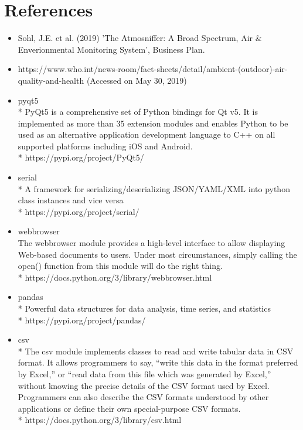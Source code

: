 \chapter{References} %

\begin{itemize}
	\item Sohl, J.E. et al. (2019) 'The Atmosniffer: A Broad Spectrum, Air $\&$ Enverionmental Monitoring System', Business Plan.
	\item https://www.who.int/news-room/fact-sheets/detail/ambient-(outdoor)-air-quality-and-health (Accessed on May 30, 2019) 
	\item pyqt5
		\\* PyQt5 is a comprehensive set of Python bindings for Qt v5. It is implemented as more than 35 extension modules and enables Python to be used as an alternative application development language to C++ on all supported platforms including iOS and Android.
		\\* https://pypi.org/project/PyQt5/
	\item serial
		\\*  A framework for serializing/deserializing JSON/YAML/XML into python class instances and vice versa
		\\* https://pypi.org/project/serial/
	\item webbrowser
		\\ The webbrowser module provides a high-level interface to allow displaying Web-based documents to users. Under most circumstances, simply calling the open() function from this module will do the right thing.
		\\* https://docs.python.org/3/library/webbrowser.html
	\item pandas
		\\* Powerful data structures for data analysis, time series, and statistics
		\\* https://pypi.org/project/pandas/
	\item csv
		\\* The csv module implements classes to read and write tabular data in CSV format. It allows programmers to say, “write this data in the format preferred by Excel,” or “read data from this file which was generated by Excel,” without knowing the precise details of the CSV format used by Excel. Programmers can also describe the CSV formats understood by other applications or define their own special-purpose CSV formats.
		\\* https://docs.python.org/3/library/csv.html

\end{itemize}
